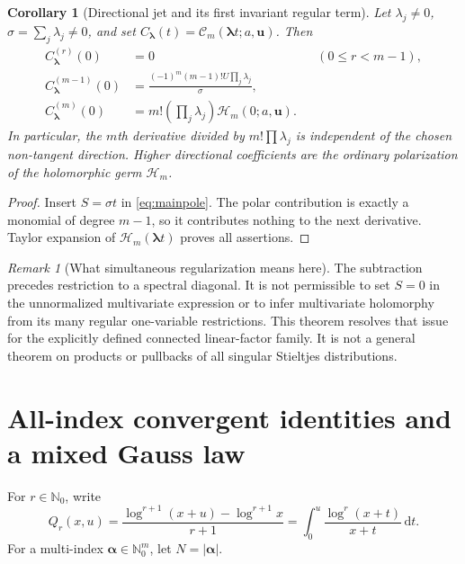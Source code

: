 \documentclass[11pt]{article}
\numberwithin{equation}{section}
\newtheorem{corollary}[theorem]{Corollary}
\theoremstyle{definition}\newtheorem{definition}[theorem]{Definition}
\theoremstyle{remark}\newtheorem{remark}[theorem]{Remark}
\newcommand{\dd}{\,\mathrm d}
\newcommand{\N}{\mathbb N}
\newcommand{\bu}{\boldsymbol{u}}
\newcommand{\ba}{\boldsymbol{\alpha}}
\newcommand{\cH}{\mathcal H}
\newcommand{\cC}{\mathcal C}
\begin{document}
\begin{corollary}[Directional jet and its first invariant regular term]\label{cor:direction}
Let $\lambda_j\ne0$, $\sigma=\sum_j\lambda_j\ne0$, and set $C_{\bm\lambda}(t)=\cC_m(\bm\lambda t;a,\bu)$. Then
\begin{align}
 C_{\bm\lambda}^{(r)}(0)&=0 &&(0\le r<m-1),\label{eq:lowzero}\\
 C_{\bm\lambda}^{(m-1)}(0)&=
 \frac{(-1)^m(m-1)!U\prod_j\lambda_j}{\sigma},\label{eq:directionanomaly}\\
 C_{\bm\lambda}^{(m)}(0)&=m!\left(\prod_j\lambda_j\right)\cH_m(0;a,\bu).
 \label{eq:directionregular}
\end{align}
In particular, the $m$th derivative divided by $m!\prod\lambda_j$ is independent of the chosen non-tangent direction. Higher directional coefficients are the ordinary polarization of the holomorphic germ $\cH_m$.
\end{corollary}
\begin{proof}
Insert $S=\sigma t$ in \eqref{eq:mainpole}. The polar contribution is exactly a monomial of degree $m-1$, so it contributes nothing to the next derivative. Taylor expansion of $\cH_m(\bm\lambda t)$ proves all assertions.
\end{proof}

\begin{remark}[What simultaneous regularization means here]
The subtraction precedes restriction to a spectral diagonal. It is not permissible to set $S=0$ in the unnormalized multivariate expression or to infer multivariate holomorphy from its many regular one-variable restrictions. This theorem resolves that issue for the explicitly defined connected linear-factor family. It is not a general theorem on products or pullbacks of all singular Stieltjes distributions.
\end{remark}

\section{All-index convergent identities and a mixed Gauss law}
For $r\in\N_0$, write
\begin{equation}\label{eq:Qr}
 Q_r(x,u)=\frac{\log^{r+1}(x+u)-\log^{r+1}x}{r+1}
          =\int_0^u\frac{\log^r(x+t)}{x+t}\dd t.
\end{equation}
For a multi-index $\ba\in\N_0^m$, let $N=|\ba|$.
\end{document}

